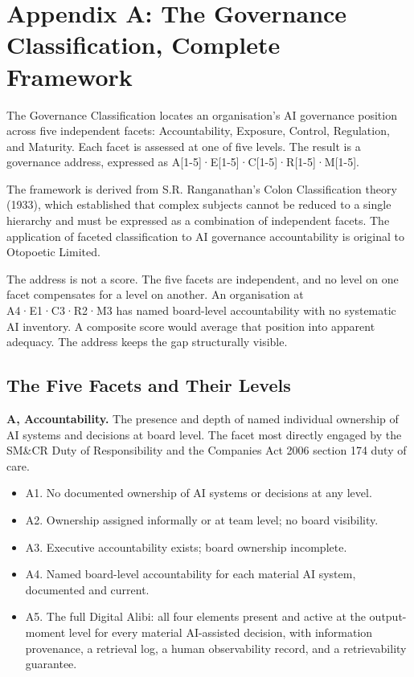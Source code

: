 
\chapter*{Appendix A: The Governance Classification, Complete Framework}

The Governance Classification locates an organisation's AI governance position across five independent facets: Accountability, Exposure, Control, Regulation, and Maturity. Each facet is assessed at one of five levels. The result is a governance address, expressed as A{[}1-5{]}·E{[}1-5{]}·C{[}1-5{]}·R{[}1-5{]}·M{[}1-5{]}.

The framework is derived from S.R. Ranganathan's Colon Classification theory (1933), which established that complex subjects cannot be reduced to a single hierarchy and must be expressed as a combination of independent facets. The application of faceted classification to AI governance accountability is original to Otopoetic Limited.

The address is not a score. The five facets are independent, and no level on one facet compensates for a level on another. An organisation at A4·E1·C3·R2·M3 has named board-level accountability with no systematic AI inventory. A composite score would average that position into apparent adequacy. The address keeps the gap structurally visible.

\section{The Five Facets and Their Levels}

\textbf{A, Accountability.} The presence and depth of named individual ownership of AI systems and decisions at board level. The facet most directly engaged by the SM\&CR Duty of Responsibility and the Companies Act 2006 section 174 duty of care.

\begin{itemize}
\tightlist
\item
  A1. No documented ownership of AI systems or decisions at any level.
\item
  A2. Ownership assigned informally or at team level; no board visibility.
\item
  A3. Executive accountability exists; board ownership incomplete.
\item
  A4. Named board-level accountability for each material AI system, documented and current.
\item
  A5. The full Digital Alibi: all four elements present and active at the output-moment level for every material AI-assisted decision, with information provenance, a retrieval log, a human observability record, and a retrievability guarantee.
\end{itemize}

